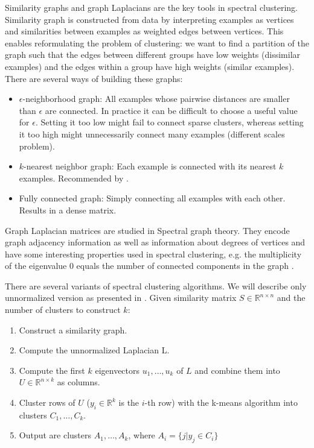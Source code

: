 \documentclass[conference]{IEEEtran}
\begin{document}
Similarity graphs and graph Laplacians are the key tools in spectral clustering.
Similarity graph is constructed from data by interpreting examples as vertices and similarities
between examples as weighted edges between vertices. This enables reformulating the problem
of clustering: we want to find a partition of the graph such that the edges between different groups
have low weights (dissimilar examples) and the edges within a group have high weights (similar examples).
There are several ways of building these graphs:
\begin{itemize}
    \item $\epsilon$-neighborhood graph: All examples whose pairwise distances are smaller than $\epsilon$
    are connected. In practice it can be difficult to choose a useful value for $\epsilon$. Setting it too
    low might fail to connect sparse clusters, whereas setting it too high might unnecessarily connect many
    examples (different scales problem).
    \item $k$-nearest neighbor graph: Each example is connected with its nearest $k$ examples. Recommended
    by \cite{luxburg07}.
    \item Fully connected graph: Simply connecting all examples with each other. Results in a dense matrix.
\end{itemize}


Graph Laplacian matrices are studied in Spectral graph theory. They encode graph adjacency information
as well as information about degrees of vertices and have some interesting properties used in spectral
clustering, e.g. the multiplicity of the eigenvalue 0 equals the number of connected components in the graph
\cite{mohar91,mohar97}.

There are several variants of spectral clustering algorithms. We will describe only unnormalized version
as presented in \cite{luxburg07}. Given similarity matrix $S \in \mathbb{R}^{n \times n}$ and the number
of clusters to construct $k$:


\begin{enumerate}
    \item Construct a similarity graph.
    \item Compute the unnormalized Laplacian L.
    \item Compute the first $k$ eigenvectors $u_1, \dots, u_k$ of $L$ and combine them into
    $U \in \mathbb{R}^{n \times k}$ as columns.
    \item Cluster rows of $U$ ($y_i \in \mathbb{R}^k$ is the $i$-th row) with the k-means algorithm
    into clusters $C_1, \dots, C_k$.
    \item Output are clusters $A_1, \dots, A_k$, where $A_i = \{ j|y_j \in C_i \}$
\end{enumerate}
\end{document}

